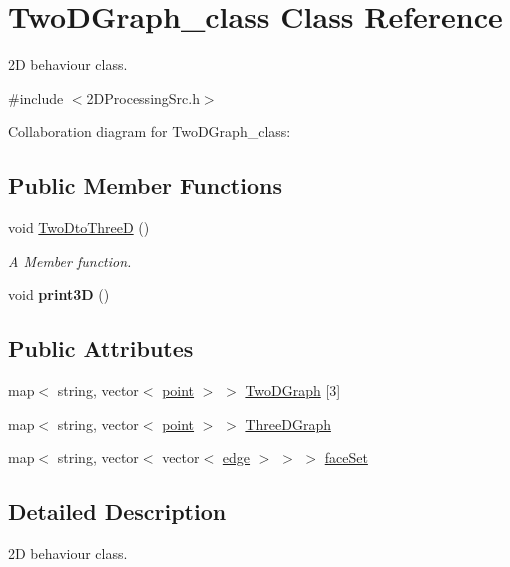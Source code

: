 \hypertarget{classTwoDGraph__class}{}\section{Two\+D\+Graph\+\_\+class Class Reference}
\label{classTwoDGraph__class}


2D behaviour class.  




{\ttfamily \#include $<$2\+D\+Processing\+Src.\+h$>$}



Collaboration diagram for Two\+D\+Graph\+\_\+class\+:
\subsection*{Public Member Functions}
\begin{DoxyCompactItemize}
\item 
void \hyperlink{classTwoDGraph__class_a48222790dda1c34caf1366ce1cc0ce1d}{Two\+Dto\+ThreeD} ()
\begin{DoxyCompactList}\small\item\em A Member function. \end{DoxyCompactList}\item 
void {\bfseries print3D} ()\hypertarget{classTwoDGraph__class_a767c2d4861c0b78aa617e1403fcb65e1}{}\label{classTwoDGraph__class_a767c2d4861c0b78aa617e1403fcb65e1}

\end{DoxyCompactItemize}
\subsection*{Public Attributes}
\begin{DoxyCompactItemize}
\item 
map$<$ string, vector$<$ \hyperlink{structpoint}{point} $>$ $>$ \hyperlink{classTwoDGraph__class_aab69ccead28f685a9e084f52e1488354}{Two\+D\+Graph} \mbox{[}3\mbox{]}
\item 
map$<$ string, vector$<$ \hyperlink{structpoint}{point} $>$ $>$ \hyperlink{classTwoDGraph__class_a6b9cd70ed1be50fb248b56f6da30a3c5}{Three\+D\+Graph}
\item 
map$<$ string, vector$<$ vector$<$ \hyperlink{structedge}{edge} $>$ $>$ $>$ \hyperlink{classTwoDGraph__class_a80d22cc10e3cfa2d3f090bc0b506e2ea}{face\+Set}
\end{DoxyCompactItemize}


\subsection{Detailed Description}
2D behaviour class. 

